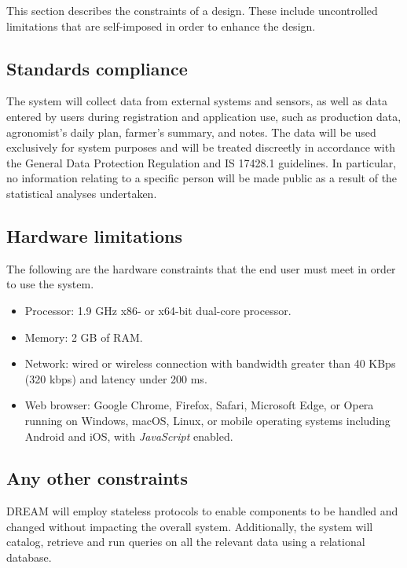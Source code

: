 This section describes the constraints of a design. These include uncontrolled limitations that are self-imposed in order to enhance the design.

\subsection{Standards compliance}

The system will collect data  from external systems and sensors, as well as data entered by users during registration and application use, such as production data, agronomist's daily plan, farmer's summary, and notes. The data will be used exclusively for system purposes and will be treated discreetly in accordance with the General Data Protection Regulation \cite{GDPR} and IS 17428.1 \cite{india_privacy_doc} guidelines. In particular, no information relating to a specific person will be made public as a result of the statistical analyses undertaken.

\subsection{Hardware limitations}

The following are the hardware constraints that the end user must meet in order to use the system.

\begin{itemize}
    \item Processor: 1.9 GHz x86- or x64-bit dual-core processor.
    \item Memory: 2 GB of RAM.
    \item Network: wired or wireless connection with bandwidth greater than 40 KBps (320 kbps) and latency under 200 ms.
    \item Web browser: Google Chrome, Firefox, Safari, Microsoft Edge, or Opera running on Windows, macOS, Linux, or mobile operating systems including Android and iOS, with \textit{JavaScript} enabled.
\end{itemize}

\subsection{Any other constraints}

DREAM will employ stateless protocols to enable components to be handled and changed without impacting the overall system. Additionally, the system will catalog, retrieve and run queries on all the relevant data using a relational database.

